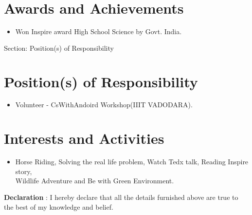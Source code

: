 \documentclass{article}
\begin{document}

\section{Awards and Achievements}
\begin{itemize}
\item Won Inspire award High School Science by Govt. India.
 
\end{itemize}

Section: Position(s) of Responsibility
\section{Position(s) of Responsibility}

\begin{itemize}
\item Volunteer - CsWithAndoird Workshop(IIIT VADODARA). 
\end{itemize}



\section{Interests and Activities}
\begin{itemize}
\item[] Horse Riding, Solving the real life problem,  Watch Tedx talk, Reading Inspire story, \\Wildlife Adventure and Be with Green Environment.\end{itemize}

\textbf{Declaration} : I hereby declare that all the details furnished above are true to the best of my knowledge and belief.
\end{document}
